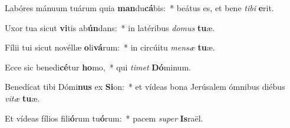 \item Labóres mánuum tuárum quia \textbf{man}du\textbf{cá}bis:~* beátus es, et bene \textit{ti}\textit{bi} \textbf{e}rit.
\item Uxor tua sicut \textbf{vi}tis ab\textbf{ún}dans:~* in latéribus \textit{do}\textit{mus} \textbf{tu}æ.
\item Fílii tui sicut novéllæ \textbf{o}li\textbf{vá}rum:~* in circúitu \textit{men}\textit{sæ} \textbf{tu}æ.
\item Ecce sic benedi\textbf{cé}tur \textbf{ho}mo,~* qui \textit{ti}\textit{met} \textbf{Dó}minum.
\item Benedícat tibi Dómi\textbf{nus} ex \textbf{Si}on:~* et vídeas bona Jerúsalem ómnibus diébus \textit{vi}\textit{tæ} \textbf{tu}æ.
\item Et vídeas fílios fili\textbf{ó}rum tu\textbf{ó}rum:~* pacem \textit{su}\textit{per} \textbf{Is}raël.
